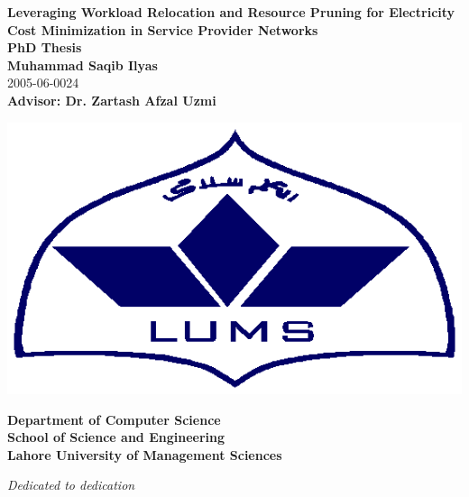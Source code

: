 \newpage
\thispagestyle{empty}
\begin{center}
  \vspace*{0.2in}
  {\LARGE \bf Leveraging Workload Relocation and Resource Pruning for Electricity Cost Minimization in Service Provider Networks}\\
  \vspace*{0.5in}
  {\Large \bf PhD Thesis}\\

  \vspace*{0.4in}
  {\Large\bf Muhammad Saqib Ilyas}\\
    \vspace*{0.2in}
  {\Large 2005-06-0024}\\
  \vspace*{0.4in}
  {\Large\bf Advisor: Dr. Zartash Afzal Uzmi}\\

	\vspace*{0.4in}
  \begin{center}
   \includegraphics[scale = 0.5]{./pics/lums.eps}
  \end{center}
  \vspace*{0.4in}  
  {\Large\bf Department of Computer Science} \\
  \vspace*{0.2in}
  {\Large\bf School of Science and Engineering} \\
  \vspace*{0.2in}
  {\Large \bf Lahore University of Management Sciences}
  
  
\end{center}
\newpage
\thispagestyle{empty}
\begin{center}
 \vspace*{3in}
  \textit{\LARGE {Dedicated to dedication}}\\

\end{center}

